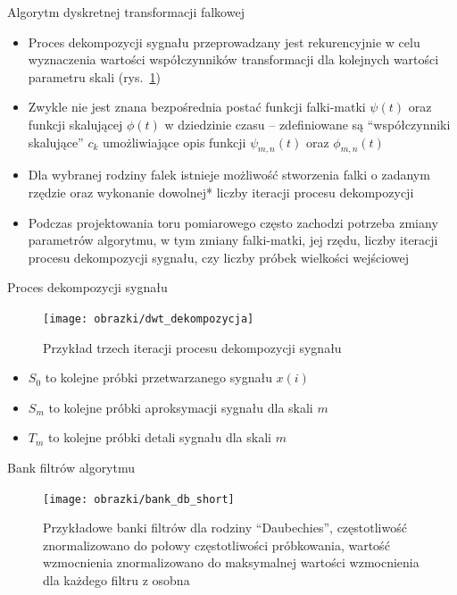 \documentclass[12pt, polish, aspectratio = 169]{beamer}
\begin{document}
\begin{frame}{Algorytm dyskretnej transformacji falkowej}
\begin{itemize}
\item Proces dekompozycji sygnału przeprowadzany jest rekurencyjnie w celu wyznaczenia wartości współczynników transformacji dla kolejnych wartości parametru skali (rys.~\ref{fig:fwt_decomp})
\item Zwykle nie jest znana bezpośrednia postać funkcji falki-matki $\psi(t)$ oraz funkcji skalującej $\phi(t)$ w dziedzinie czasu -- zdefiniowane są \enquote{współczynniki skalujące} $c_{k}$ umożliwiające opis funkcji $\psi_{m,n}(t)$ oraz $\phi_{m,n}(t)$
\item Dla wybranej rodziny falek istnieje możliwość stworzenia falki o zadanym rzędzie oraz wykonanie dowolnej* liczby iteracji procesu dekompozycji
\item Podczas projektowania toru pomiarowego często zachodzi potrzeba zmiany parametrów algorytmu, w tym zmiany falki-matki, jej rzędu, liczby iteracji procesu dekompozycji sygnału, czy liczby próbek wielkości wejściowej
\end{itemize}
\end{frame}

\begin{frame}{Proces dekompozycji sygnału}
\begin{figure}
\texttt{[image: obrazki/dwt\_dekompozycja]}
\caption{Przykład trzech iteracji procesu dekompozycji sygnału}
\label{fig:fwt_decomp}
\end{figure}
\begin{itemize}
\item $S_{0}$ to kolejne próbki przetwarzanego sygnału $x(i)$
\item $S_{m}$ to kolejne próbki aproksymacji sygnału dla skali $m$
\item $T_{m}$ to kolejne próbki detali sygnału dla skali $m$
\end{itemize}
\end{frame}

\begin{frame}{Bank filtrów algorytmu}
\begin{figure}
\texttt{[image: obrazki/bank\_db\_short]}
\caption{Przykładowe banki filtrów dla rodziny \enquote{Daubechies}, częstotliwość znormalizowano do połowy częstotliwości próbkowania, wartość wzmocnienia znormalizowano do maksymalnej wartości wzmocnienia dla każdego filtru z osobna}
\end{figure}
\end{frame}
\end{document}
